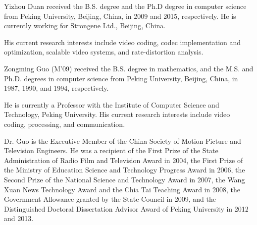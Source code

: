\documentclass[journal,draftclsnofoot,onecolumn]{IEEEtran}
\begin{document}
\begin{IEEEbiography}{Yizhou Duan}
received the B.S. degree and the Ph.D degree in computer science from Peking University, Beijing, China, in 2009 and 2015, respectively. He is currently working for Strongene Ltd., Beijing, China.

His current research interests include video coding, codec implementation and optimization, scalable video systems, and rate-distortion analysis.
\end{IEEEbiography}

\begin{IEEEbiography}{Zongming Guo}
(M’09) received the B.S. degree in mathematics, and the M.S. and Ph.D. degrees in computer science from Peking University, Beijing, China, in 1987, 1990, and 1994, respectively.

He is currently a Professor with the Institute of Computer Science and Technology, Peking University. His current research interests include video coding, processing, and communication.

Dr. Guo is the Executive Member of the China-Society of Motion Picture and Television Engineers. He was a recipient of the First Prize of the State Administration of Radio Film and Television Award in 2004, the First Prize of the Ministry of Education Science and Technology Progress Award in 2006, the Second Prize of the National Science and Technology Award in 2007, the Wang Xuan News Technology Award and the Chia Tai Teaching Award in 2008, the Government Allowance granted by the State Council in 2009, and the Distinguished Doctoral Dissertation Advisor Award of Peking University in 2012 and 2013.

\end{IEEEbiography}
\end{document}
